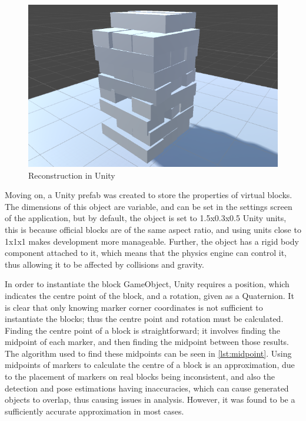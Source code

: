 \begin{figure}[ht]
    \centering
    \includegraphics[width=\textwidth]{images/implementation/reconstruction}
    \caption{Reconstruction in Unity}
    \label{fig:reconstructionunity}
\end{figure}

Moving on, a Unity prefab was created to store the properties of virtual \jenga{} blocks. The dimensions of this object are variable, and can be set in the settings screen of the application, but by default, the object is set to 1.5x0.3x0.5 Unity units, this is because official \jenga{} blocks are of the same aspect ratio, and using units close to 1x1x1 makes development more manageable. Further, the object has a rigid body component attached to it, which means that the physics engine can control it, thus allowing it to be affected by collisions and gravity.

In order to instantiate the block GameObject, Unity requires a position, which indicates the centre point of the block, and a rotation, given as a Quaternion. It is clear that only knowing marker corner coordinates is not sufficient to instantiate the blocks; thus the centre point and rotation must be calculated. Finding the centre point of a block is straightforward; it involves finding the midpoint of each marker, and then finding the midpoint between those results. The algorithm used to find these midpoints can be seen in \cref{lst:midpoint}. Using midpoints of markers to calculate the centre of a block is an approximation, due to the placement of markers on real blocks being inconsistent, and also the detection and pose estimations having inaccuracies, which can cause generated objects to overlap, thus causing issues in analysis. However, it was found to be a sufficiently accurate approximation in most cases.


